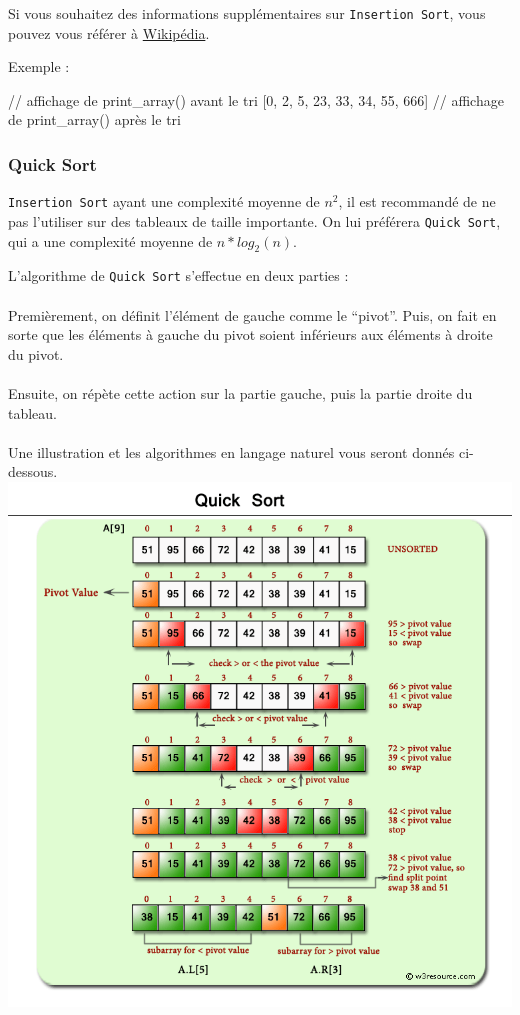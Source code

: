 Si vous souhaitez des informations supplémentaires sur \texttt{Insertion Sort}, vous pouvez vous référer à \href{https://en.wikipedia.org/wiki/Insertion_sort}{Wikipédia}.


Exemple :

\begin{code}
[0, 34, 5, 55, 666, 33, 23, 2] // affichage de print_array() avant le tri
[0, 2, 5, 23, 33, 34, 55, 666] // affichage de print_array() après le tri
\end{code}

\subsubsection{Quick Sort}

\texttt{Insertion Sort} ayant une complexité moyenne de $n^2$, il est recommandé de ne pas l'utiliser sur des tableaux de taille importante. On lui préférera \texttt{Quick Sort}, qui a une complexité moyenne de $n*log_2(n)$.

L'algorithme de \texttt{Quick Sort} s'effectue en deux parties : 
\\\\
Premièrement, on définit l'élément de gauche comme le ``pivot''. Puis, on fait en sorte que les éléments à gauche du pivot soient inférieurs aux éléments à droite du pivot.
\\\\
Ensuite, on répète cette action sur la partie gauche, puis la partie droite du tableau.
\\\\
Une illustration et les algorithmes en langage naturel vous seront donnés ci-dessous.\\

\includegraphics[width=15cm]{img/quick_sort.png}

